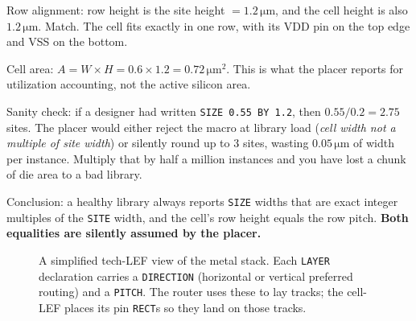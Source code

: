 Row alignment: row height is the site height $= 1.2\,\si{\micro\meter}$, and the cell height is also $1.2\,\si{\micro\meter}$. Match. The cell fits exactly in one row, with its VDD pin on the top edge and VSS on the bottom.


Cell area: $A = W \times H = 0.6 \times 1.2 = 0.72\,\si{\micro\meter\squared}$. This is what the placer reports for utilization accounting, not the active silicon area.


Sanity check: if a designer had written \texttt{SIZE 0.55 BY 1.2}, then $0.55 / 0.2 = 2.75$ sites. The placer would either reject the macro at library load (\emph{cell width not a multiple of site width}) or silently round up to 3 sites, wasting $0.05\,\si{\micro\meter}$ of width per instance. Multiply that by half a million instances and you have lost a chunk of die area to a bad library.


Conclusion: a healthy library always reports \texttt{SIZE} widths that are exact integer multiples of the \texttt{SITE} width, and the cell's row height equals the row pitch. \textbf{Both equalities are silently assumed by the placer.}


\begin{figure}[h]
\centering
{}
\caption{A simplified tech-LEF view of the metal stack. Each \texttt{LAYER} declaration carries a \texttt{DIRECTION} (horizontal or vertical preferred routing) and a \texttt{PITCH}. The router uses these to lay tracks; the cell-LEF places its pin \texttt{RECT}s so they land on those tracks.}
\label{fig:metal-stack}
\end{figure}

